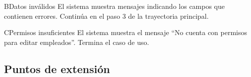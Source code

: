 \begin{UCtrayectoriaA}{B}{Datos inválidos}
	\UCpaso El sistema muestra mensajes indicando los campos que contienen errores.
	\UCpaso Continúa en el paso 3 de la trayectoria principal.
\end{UCtrayectoriaA}

\begin{UCtrayectoriaA}{C}{Permisos insuficientes}
	\UCpaso El sistema muestra el mensaje ``No cuenta con permisos para editar empleados''.
	\UCpaso Termina el caso de uso.
\end{UCtrayectoriaA}

\subsection{Puntos de extensión}


